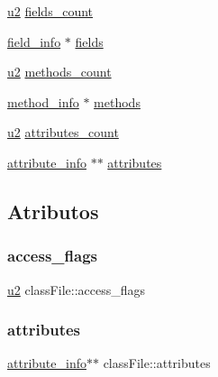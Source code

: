 \begin{DoxyCompactItemize}
\item 
\hyperlink{lista__operandos_8h_a732cde1300aafb73b0ea6c2558a7a54f}{u2} \hyperlink{structclassFile_aab140aacadd635ec42e6117d90f7363a}{fields\+\_\+count}
\item 
\hyperlink{structfield__info}{field\+\_\+info} $\ast$ \hyperlink{structclassFile_af08165230270046ef4f4dcc6fb8133ae}{fields}
\item 
\hyperlink{lista__operandos_8h_a732cde1300aafb73b0ea6c2558a7a54f}{u2} \hyperlink{structclassFile_a8c3eb4279e03c8b8f6525b6dd0ff6126}{methods\+\_\+count}
\item 
\hyperlink{structmethod__info}{method\+\_\+info} $\ast$ \hyperlink{structclassFile_a5417beaa23b6e9d5329dbee87a1f5238}{methods}
\item 
\hyperlink{lista__operandos_8h_a732cde1300aafb73b0ea6c2558a7a54f}{u2} \hyperlink{structclassFile_a9c2f1bdfe0c43e7189f2a7100bec1966}{attributes\+\_\+count}
\item 
\hyperlink{structattribute__info}{attribute\+\_\+info} $\ast$$\ast$ \hyperlink{structclassFile_a49c7b5a9f1718d9a883d3db7eb650757}{attributes}
\end{DoxyCompactItemize}


\subsection{Atributos}
\mbox{\label{structclassFile_a78e101546396d4b3d24d89b084b4eadf}} 
\subsubsection{\texorpdfstring{access\+\_\+flags}{access\_flags}}
{\footnotesize\ttfamily \hyperlink{lista__operandos_8h_a732cde1300aafb73b0ea6c2558a7a54f}{u2} class\+File\+::access\+\_\+flags}

\mbox{\label{structclassFile_a49c7b5a9f1718d9a883d3db7eb650757}} 
\subsubsection{\texorpdfstring{attributes}{attributes}}
{\footnotesize\ttfamily \hyperlink{structattribute__info}{attribute\+\_\+info}$\ast$$\ast$ class\+File\+::attributes}

